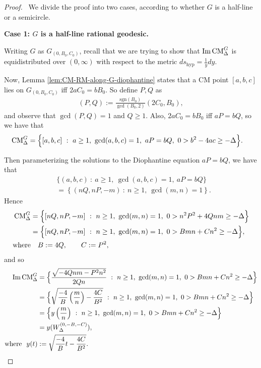 \documentclass[11pt,letterpaper,reqno]{amsart}
\numberwithin{equation}{section}
\numberwithin{figure}{section}
\numberwithin{table}{section}
\newcommand{\lrp}[1]{\left(#1\right)}
\newcommand{\lrcb}[1]{\left\{#1\right\}}
\newcommand{\CM}{\textnormal{CM}}
\begin{document}
\begin{proof} ~We divide the proof into two cases, according to whether $G$ is a half-line or a semicircle. 

\noindent\textbf{Case 1: $G$ is a half-line rational geodesic.}

Writing $G$ as $G_{(0,B_0,C_0)}$, recall that we are trying to show that $\mathrm{Im}\, \CM^{G}_{\Delta}$ is equidistributed over $(0,\infty)$ with respect to the metric $ds_\text{hyp} = \frac{1}{y}dy$.


Now, Lemma \ref{lem:CM-RM-along-G-diophantine} states that a CM point $[a,b,c]$ lies on $G_{(0,B_0,C_0)}$ iff $2aC_0=bB_0$. So define $P,Q$ as
\begin{align}
    (P,Q) := \tfrac{\mathrm{sgn}(B_0)}{\gcd(B_0,2)} (2C_0,B_0),
\end{align}
and observe that $\gcd(P,Q)=1$ and $Q \ge 1$. 
Also, $2aC_0=bB_0$ iff $aP=bQ$, so we have that
\begin{align}
    \CM^{G}_{\Delta}  
    &= \Big\{ [a,b,c] ~:~ a \ge 1,~ \gcd(a,b,c)=1,~  aP=bQ,~
    0 > b^2-4ac \ge -\Delta \Big\}.
\end{align}

Then parameterizing the solutions to the Diophantine equation $aP = bQ$, we have that
\begin{align} 
    &\Big\{ (a,b,c) ~:~ a \ge 1,~ \gcd(a,b,c)=1,~ 
    aP=bQ
    \Big\} \\
    &= \lrcb{ (nQ,nP,-m) ~:~ n \ge 1,~ \gcd(m,n)=1 }.
\end{align}
Hence
\begin{align}
    \CM^{G}_{\Delta} 
    &= \Big\{  [nQ,nP,-m]  ~:~ n \ge 1,~ \gcd(m,n)=1,~  0 > n^2P^2 + 4Qnm \ge -\Delta
    \Big\} \\
    &= \Big\{  [nQ,nP,-m]  ~:~ n \ge 1,~ \gcd(m,n)=1,~  0 > B mn + C n^2 \ge -\Delta
    \Big\}, \label{eqn:CM-G0BC-set-formula} \\
    \text{where}&\quad  B := 4Q, \qquad C := P^2,
\end{align}
and so
\begin{align}
    \mathrm{Im}\,\CM^{G}_{\Delta} 
    &= \Big\{  \frac{\sqrt{-4Qnm -P^2n^2}}{2Qn}  ~:~ n \ge 1,~ \gcd(m,n)=1,~  0 > B mn + C n^2 \ge -\Delta
    \Big\} \\
    &= \Big\{  \sqrt{\frac{-4}{B} \lrp{\frac mn} - \frac{4C}{B^2}}  ~:~ n \ge 1,~ \gcd(m,n)=1,~  0 > B mn + C n^2 \ge -\Delta
    \Big\} \\
    &=  \Big\{  y\lrp{\frac mn}  ~:~ n \ge 1,~ \gcd(m,n)=1,~  0 > B mn + C n^2 \ge -\Delta
    \Big\} \\
    &= y(W_{\Delta}^{(0,-B,-C)}), \\
    \text{where }\ y(t) 
    &:= \sqrt{\frac{-4}{B} t - \frac{4C}{B^2}}.
\end{align}


\end{proof}
\end{document}
